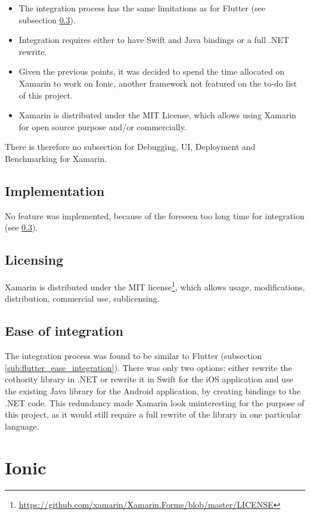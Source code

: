 \documentclass[11pt, a4paper, twoside, openright]{article} %
\begin{document}
{\begin{itemize}
	\item The integration process has the same limitations as for Flutter (see subsection \ref{sub:xamarin_integration}).
	\item Integration requires either to have Swift and Java bindings or a full .NET rewrite.
	\item Given the previous points, it was decided to spend the time allocated on Xamarin to work on Ionic, another framework not featured on the to-do list of this project.
	\item Xamarin is distributed under the MIT License, which allows using Xamarin for open source purpose and/or commercially.
\end{itemize}

There is therefore no subsection for Debugging, UI, Deployment and Benchmarking for Xamarin.

\subsection{Implementation}
No feature was implemented, because of the foreseen too long time for integration (see \ref{sub:xamarin_integration}).

\subsection{Licensing}
Xamarin is distributed under the MIT license\footnote{\url{https://github.com/xamarin/Xamarin.Forms/blob/master/LICENSE}}, which allows usage, modifications, distribution, commercial use, sublicensing.\\

\subsection{Ease of integration}
\label{sub:xamarin_integration}
The integration process was found to be similar to Flutter (subsection \ref{sub:flutter_ease_integration}). There was only two options: either rewrite the cothority library in .NET or rewrite it in Swift for the iOS application and use the existing Java library for the Android application, by creating bindings to the .NET code. 
This redundancy made Xamarin look uninteresting for the purpose of this project, as it would still require a full rewrite of the library in one particular language. 

\newpage
\section{Ionic}

}
\end{document}
